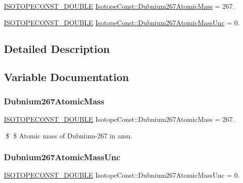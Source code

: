 \begin{DoxyCompactItemize}
\item 
\mbox{\hyperlink{group___isotope_const-_macros_ga8f45a7272ce02c0b4c65c44636ed719a}{I\+S\+O\+T\+O\+P\+E\+C\+O\+N\+S\+T\+\_\+\+D\+O\+U\+B\+LE}} \mbox{\hyperlink{group___isotope_const-_dubnium-_db267_ga2df43dfea55e7f0fc0278e15fe6d8bc3}{Isotope\+Const\+::\+Dubnium267\+Atomic\+Mass}} = 267.
\item 
\mbox{\hyperlink{group___isotope_const-_macros_ga8f45a7272ce02c0b4c65c44636ed719a}{I\+S\+O\+T\+O\+P\+E\+C\+O\+N\+S\+T\+\_\+\+D\+O\+U\+B\+LE}} \mbox{\hyperlink{group___isotope_const-_dubnium-_db267_gac5d02c04858ce2f3afd890afcab49f0a}{Isotope\+Const\+::\+Dubnium267\+Atomic\+Mass\+Unc}} = 0.
\end{DoxyCompactItemize}


\subsection{Detailed Description}


\subsection{Variable Documentation}
\mbox{\label{group___isotope_const-_dubnium-_db267_ga2df43dfea55e7f0fc0278e15fe6d8bc3}} 
\subsubsection{\texorpdfstring{Dubnium267\+Atomic\+Mass}{Dubnium267AtomicMass}}
{\footnotesize\ttfamily \mbox{\hyperlink{group___isotope_const-_macros_ga8f45a7272ce02c0b4c65c44636ed719a}{I\+S\+O\+T\+O\+P\+E\+C\+O\+N\+S\+T\+\_\+\+D\+O\+U\+B\+LE}} Isotope\+Const\+::\+Dubnium267\+Atomic\+Mass = 267.}

\$ \$ Atomic mass of Dubnium-\/267 in amu. \mbox{\label{group___isotope_const-_dubnium-_db267_gac5d02c04858ce2f3afd890afcab49f0a}} 
\subsubsection{\texorpdfstring{Dubnium267\+Atomic\+Mass\+Unc}{Dubnium267AtomicMassUnc}}
{\footnotesize\ttfamily \mbox{\hyperlink{group___isotope_const-_macros_ga8f45a7272ce02c0b4c65c44636ed719a}{I\+S\+O\+T\+O\+P\+E\+C\+O\+N\+S\+T\+\_\+\+D\+O\+U\+B\+LE}} Isotope\+Const\+::\+Dubnium267\+Atomic\+Mass\+Unc = 0.}

